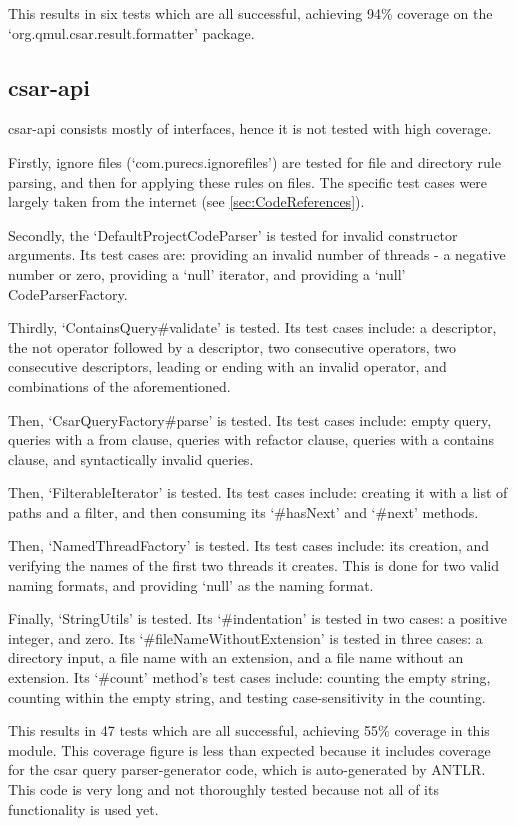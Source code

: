 \documentclass[12pt, letterpaper]{article}
\begin{document}
This results in six tests which are all successful, achieving 94\% coverage on the `org.qmul.csar.result.formatter' package.

\subsection{csar-api}
csar-api consists mostly of interfaces, hence it is not tested with high coverage.

Firstly, ignore files (`com.purecs.ignorefiles') are tested for file and directory rule parsing, and then for applying these rules on files.
The specific test cases were largely taken from the internet (see \ref{sec:CodeReferences}).

Secondly, the `DefaultProjectCodeParser' is tested for invalid constructor arguments.
Its test cases are: providing an invalid number of threads - a negative number or zero, providing a `null' iterator, and providing a `null' CodeParserFactory.

Thirdly, `ContainsQuery\#validate' is tested.
Its test cases include: a descriptor, the not operator followed by a descriptor, two consecutive operators, two consecutive descriptors, leading or ending with an invalid operator, and combinations of the aforementioned.

Then, `CsarQueryFactory\#parse' is tested.
Its test cases include: empty query, queries with a from clause, queries with refactor clause, queries with a contains clause, and syntactically invalid queries.

Then, `FilterableIterator' is tested.
Its test cases include: creating it with a list of paths and a filter, and then consuming its `\#hasNext' and `\#next' methods.

Then, `NamedThreadFactory' is tested.
Its test cases include: its creation, and verifying the names of the first two threads it creates.
This is done for two valid naming formats, and providing `null' as the naming format.

Finally, `StringUtils' is tested.
Its `\#indentation' is tested in two cases: a positive integer, and zero.
Its `\#fileNameWithoutExtension' is tested in three cases: a directory input, a file name with an extension, and a file name without an extension.
Its `\#count' method's test cases include: counting the empty string, counting within the empty string, and testing case-sensitivity in the counting.

This results in 47 tests which are all successful, achieving 55\% coverage in this module.
This coverage figure is less than expected because it includes coverage for the csar query parser-generator code, which is auto-generated by ANTLR.
This code is very long and not thoroughly tested because not all of its functionality is used yet.
\end{document}
